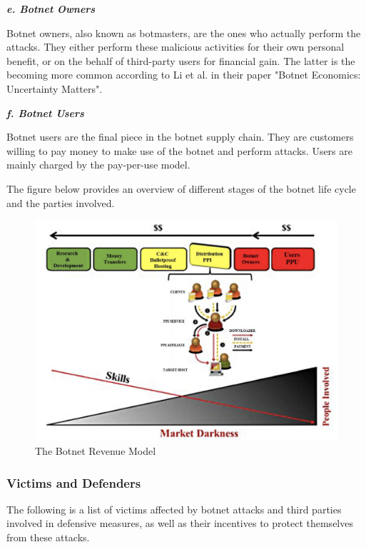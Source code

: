 			\textbf{\textit{e. Botnet Owners}}
			
	Botnet owners, also known as botmasters, are the ones who actually perform the attacks. They either perform these malicious activities for their own personal benefit, or on the behalf of third-party users for financial gain. The latter is the becoming more common according to Li et al. in their paper "Botnet Economics: Uncertainty Matters".

			\textbf{\textit{f. Botnet Users}}
			
			Botnet users are the final piece in the botnet supply chain. They are customers willing to pay money to make use of the botnet and perform attacks. Users are mainly charged by the pay-per-use model.

The figure below provides an overview of different stages of the botnet life cycle and the parties involved. 


\begin{figure}[ht]
\begin{center} \includegraphics[scale=0.6]{Talk11/RevenueModel} \end{center}
\caption{The Botnet Revenue Model}
\label{label}
\end{figure}

		\subsubsection{Victims and Defenders}
	The following is a list of victims affected by botnet attacks and third parties involved in defensive measures, as well as their incentives to protect themselves from these attacks.

